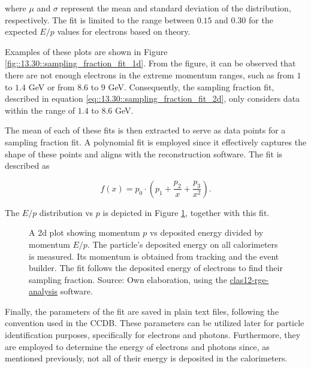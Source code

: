     where $\mu$ and $\sigma$ represent the mean and standard deviation of the distribution, respectively. The fit is limited to the range between $0.15$ and $0.30$ for the expected $E/p$ values for electrons based on theory.

    Examples of these plots are shown in Figure \ref{fig::13.30::sampling_fraction_fit_1d}.
    From the figure, it can be observed that there are not enough electrons in the extreme momentum ranges, such as from $1$ to $1.4$ GeV or from $8.6$ to $9$ GeV.
    Consequently, the sampling fraction fit, described in equation \eqref{eq::13.30::sampling_fraction_fit_2d}, only considers data within the range of $1.4$ to $8.6$ GeV.

    The mean of each of these fits is then extracted to serve as data points for a sampling fraction fit.
    A polynomial fit is employed since it effectively captures the shape of these points and aligns with the reconstruction software.
    The fit is described as

    \begin{equation} \label{eq::13.30::sampling_fraction_fit_2d}
        f(x) = p_0 \cdot \left(p_1 + \frac{p_2}{x} + \frac{p_3}{x^2}\right).
    \end{equation}

    The $E/p$ distribution vs $p$ is depicted in Figure \ref{fig::13.30::sampling_fraction_fit_2d}, together with this fit.

    \begin{figure}[t!]
        \centering{}
        \caption[Calorimeters $p vs E/p$ plots]{A 2d plot showing momentum $p$ vs deposited energy divided by momentum $E/p$.
        The particle's deposited energy on all calorimeters is measured.
        Its momentum is obtained from tracking and the event builder.
        The fit follows the deposited energy of electrons to find their sampling fraction.
        Source: Own elaboration, using the \hyperlink{github.com/bleaktwig/clas12-rge-analysis}{clas12-rge-analysis} software.}
        \label{fig::13.30::sampling_fraction_fit_2d}
    \end{figure}

    Finally, the parameters of the fit are saved in plain text files, following the convention used in the CCDB.
    These parameters can be utilized later for particle identification purposes, specifically for electrons and photons.
    Furthermore, they are employed to determine the energy of electrons and photons since, as mentioned previously, not all of their energy is deposited in the calorimeters.
